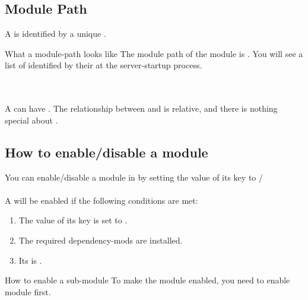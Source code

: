 \subsection{Module Path}
A  is identified by a unique .
\begin{example}{What a module-path looks like}
    The module path of the module  is .
    You will see a list of  identified by their  at the server-startup process.
\end{example}
\\
\\
A  can have .
The relationship between  and  is relative, and there is nothing special about .

\subsection{How to enable/disable a module}
You can enable/disable a module in  by setting the value of its  key to /
\\
\\
A  will be enabled if the following conditions are met:
\begin{enumerate}
    \item The value of its  key is set to .
    \item The required dependency-mods are installed.
    \item Its  is .
\end{enumerate}

\begin{example}{How to enable a sub-module}
    To make the module  enabled, you need to enable  module first.
\end{example}
